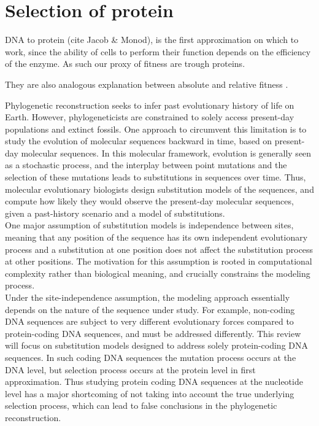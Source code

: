 \chapter{Selection of protein}
\minitoc
\label{sec:selection}
\acrshort{DNA} to protein (cite Jacob \& Monod), is the first approximation on which to work, since the ability of cells to perform their function depends on the efficiency of the enzyme.
As such our proxy of fitness are trough proteins.

They are also analogous explanation between absolute and relative fitness \citep{Masel2016}.

Phylogenetic reconstruction seeks to infer past evolutionary history of life on Earth.
However, phylogeneticists are constrained to solely access present-day populations and extinct fossils.
One approach to circumvent this limitation is to study the evolution of molecular sequences backward in time, based on present-day molecular sequences.
In this molecular framework, evolution is generally seen as a stochastic process, and the interplay between point mutations and the selection of these mutations leads to substitutions in sequences over time.
Thus, molecular evolutionary biologists design substitution models of the sequences, and compute how likely they would observe the present-day molecular sequences, given a past-history scenario and a model of substitutions.\\
One major assumption of substitution models is independence between sites, meaning that any position of the sequence has its own independent evolutionary process and a substitution at one position does not affect the substitution process at other positions.
The motivation for this assumption is rooted in computational complexity rather than biological meaning, and crucially constrains the modeling process.\\
Under the site-independence assumption, the modeling approach essentially depends on the nature of the sequence under study.
For example, non-coding \acrshort{DNA} sequences are subject to very different evolutionary forces compared to protein-coding \acrshort{DNA} sequences, and must be addressed differently.
This review will focus on substitution models designed to address solely protein-coding \acrshort{DNA} sequences.
In such coding \acrshort{DNA} sequences the mutation process occurs at the \acrshort{DNA} level, but selection process occurs at the protein level in first approximation.
Thus studying protein coding \acrshort{DNA} sequences at the nucleotide level has a major shortcoming of not taking into account the true underlying selection process, which can lead to false conclusions in the phylogenetic reconstruction.\\
